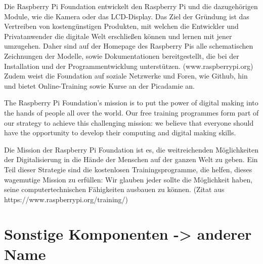 \documentclass[12pt,a4paper]{report}
\begin{document}
Die Raspberry Pi Foundation entwickelt den Raspberry Pi und die dazugehörigen Module, wie die Kamera oder das LCD-Display. Das Ziel der Gründung ist das Vertreiben von kostengünstigen Produkten, mit welchen die Entwickler und Privatanwender die digitale Welt erschließen können und lernen mit jener umzugehen. Daher sind auf der Homepage des Raspberry Pis alle schematischen Zeichnungen der Modelle, sowie Dokumentationen bereitgestellt, die bei der Installation und der Programmentwicklung unterstützen. (www.raspberrypi.org)
Zudem weist die Foundation auf soziale Netzwerke und Foren, wie Github, hin und bietet Online-Training sowie Kurse an der Picadamie an.

The Raspberry Pi Foundation’s mission is to put the power of digital making into the hands of people all over the world. Our free training programmes form part of our strategy to achieve this challenging mission: we believe that everyone should have the opportunity to develop their computing and digital making skills.

Die Mission der Raspberry Pi Foundation ist es, die weitreichenden Möglichkeiten der Digitalisierung in die Hände der Menschen auf der ganzen Welt zu geben. Ein Teil dieser Strategie sind die kostenlosen Trainingsprogramme, die helfen, dieses wagemutige Mission zu erfüllen: Wir glauben jeder sollte die Möglichkeit haben, seine computertechnischen Fähigkeiten ausbauen zu können. (Zitat aus https://www.raspberrypi.org/training/)

\section{Sonstige Komponenten -> anderer Name}
\end{document}
